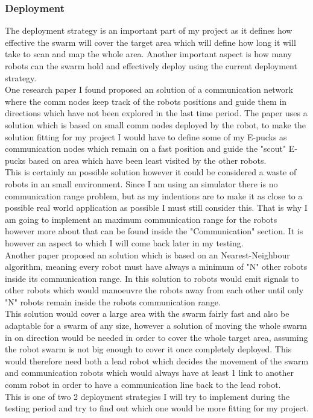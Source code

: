 \documentclass[10pt,a4paper]{article}
\begin{document}
\begin{flushleft}
\subsubsection{Deployment}
The deployment strategy is an important part of my project as it defines how effective the swarm will cover the target area which will define how long it will take to scan and map the whole area. Another important aspect is how many robots can the swarm hold and effectively deploy using the current deployment strategy. \\ 
One research paper I found proposed an solution of a communication network where the comm nodes keep track of the robots positions and guide them in directions which have not been explored in the last time period\cite{Batalin2003Coverage}. The paper uses a solution which is based on small comm nodes deployed by the robot, to make the solution fitting for my project I would have to define some of my E-pucks as communication nodes which remain on a fast position and guide the "scout" E-pucks based on area which have been least visited by the other robots.\\ 
This is certainly an possible solution however it could be considered a waste of robots in an small environment. Since I am using an simulator there is no communication range problem, but as my indentions are to make it as close to a possible real world application as possible I must still consider this.
That is why I am going to implement an maximum communication range for the robots however more about that can be found inside the "Communication" section. It is however an aspect to which I will come back later in my testing.\\[3ex]

Another paper proposed an solution which is based on an Nearest-Neighbour algorithm, meaning every robot must have always a minimum of "N" other robots inside its communication range\cite{Poduri2004Constrained}. In this solution to robots would emit signals to other robots which would manoeuvre the robots away from each other until only "N" robots remain inside the robots communication range. \\
This solution would cover a large area with the swarm fairly fast and also be adaptable for a swarm of any size, however a solution of moving the whole swarm in on direction would be needed in order to cover the whole target area, assuming the robot swarm is not big enough to cover it once completely deployed.
This would therefore need both a lead robot which decides the movement of the swarm and communication robots which would always have at least 1 link to another comm robot in order to have a communication line back to the lead robot. \\
This is one of two 2 deployment strategies I will try to implement during the testing period and try to find out which one would be more fitting for my project.\\[3ex]


\end{flushleft}
\end{document}
